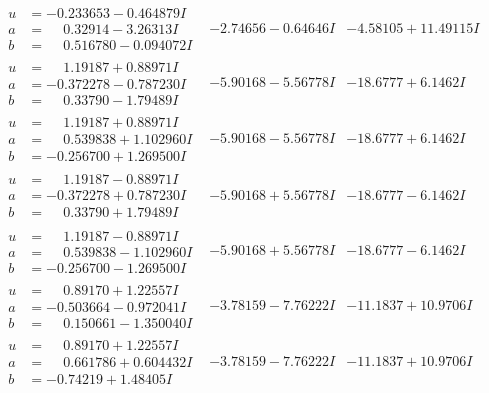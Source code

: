 \documentclass[1p]{elsarticle_modified}
\theoremstyle{definition}
\begin{document}
$$\begin{array}{c|c|c}
\begin{aligned}
u &= -0.233653 - 0.464879 I \\
a &= \phantom{-}0.32914 - 3.26313 I \\
b &= \phantom{-}0.516780 - 0.094072 I\end{aligned}
 & -2.74656 - 0.64646 I & -4.58105 + 11.49115 I \\ \hline\begin{aligned}
u &= \phantom{-}1.19187 + 0.88971 I \\
a &= -0.372278 - 0.787230 I \\
b &= \phantom{-}0.33790 - 1.79489 I\end{aligned}
 & -5.90168 - 5.56778 I & -18.6777 + 6.1462 I \\ \hline\begin{aligned}
u &= \phantom{-}1.19187 + 0.88971 I \\
a &= \phantom{-}0.539838 + 1.102960 I \\
b &= -0.256700 + 1.269500 I\end{aligned}
 & -5.90168 - 5.56778 I & -18.6777 + 6.1462 I \\ \hline\begin{aligned}
u &= \phantom{-}1.19187 - 0.88971 I \\
a &= -0.372278 + 0.787230 I \\
b &= \phantom{-}0.33790 + 1.79489 I\end{aligned}
 & -5.90168 + 5.56778 I & -18.6777 - 6.1462 I \\ \hline\begin{aligned}
u &= \phantom{-}1.19187 - 0.88971 I \\
a &= \phantom{-}0.539838 - 1.102960 I \\
b &= -0.256700 - 1.269500 I\end{aligned}
 & -5.90168 + 5.56778 I & -18.6777 - 6.1462 I \\ \hline\begin{aligned}
u &= \phantom{-}0.89170 + 1.22557 I \\
a &= -0.503664 - 0.972041 I \\
b &= \phantom{-}0.150661 - 1.350040 I\end{aligned}
 & -3.78159 - 7.76222 I & -11.1837 + 10.9706 I \\ \hline\begin{aligned}
u &= \phantom{-}0.89170 + 1.22557 I \\
a &= \phantom{-}0.661786 + 0.604432 I \\
b &= -0.74219 + 1.48405 I\end{aligned}
 & -3.78159 - 7.76222 I & -11.1837 + 10.9706 I \\ \hline\begin{aligned}

\end{aligned}
\end{array}$$
\end{document}
